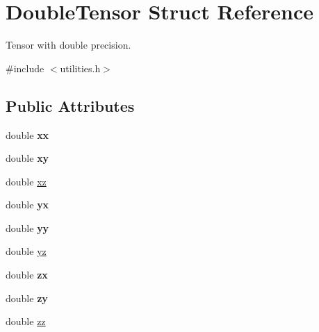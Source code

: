 \hypertarget{structDoubleTensor}{\section{Double\-Tensor Struct Reference}
\label{structDoubleTensor}
}


Tensor with double precision.  




{\ttfamily \#include $<$utilities.\-h$>$}

\subsection*{Public Attributes}
\begin{DoxyCompactItemize}
\item 
\hypertarget{structDoubleTensor_aaf7d0b05510b5483fd424c8878729e41}{double {\bfseries xx}}\label{structDoubleTensor_aaf7d0b05510b5483fd424c8878729e41}

\item 
\hypertarget{structDoubleTensor_a520cb8bf429e0331c1179806338b88cc}{double {\bfseries xy}}\label{structDoubleTensor_a520cb8bf429e0331c1179806338b88cc}

\item 
double \hyperlink{structDoubleTensor_a78677cd002a23db74c7438a9e51aa264}{xz}
\item 
\hypertarget{structDoubleTensor_a66c6e6767a51f4259d28e9d0cd9629e6}{double {\bfseries yx}}\label{structDoubleTensor_a66c6e6767a51f4259d28e9d0cd9629e6}

\item 
\hypertarget{structDoubleTensor_a05409acca2da664a1f7d4edc2c0934b9}{double {\bfseries yy}}\label{structDoubleTensor_a05409acca2da664a1f7d4edc2c0934b9}

\item 
double \hyperlink{structDoubleTensor_a0311ca5318233d1cd146c7f2ba0564a2}{yz}
\item 
\hypertarget{structDoubleTensor_a755deaf39decc01a9b1d672df38a8d28}{double {\bfseries zx}}\label{structDoubleTensor_a755deaf39decc01a9b1d672df38a8d28}

\item 
\hypertarget{structDoubleTensor_a3a2b653bb874c8c4faf2fa3a87054ad1}{double {\bfseries zy}}\label{structDoubleTensor_a3a2b653bb874c8c4faf2fa3a87054ad1}

\item 
double \hyperlink{structDoubleTensor_af3fec476b850d04a0f1e7a4cfbaceb2d}{zz}
\end{DoxyCompactItemize}


